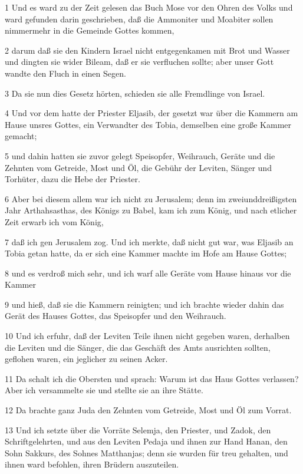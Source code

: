 \par 1 Und es ward zu der Zeit gelesen das Buch Mose vor den Ohren des Volks und ward gefunden darin geschrieben, daß die Ammoniter und Moabiter sollen nimmermehr in die Gemeinde Gottes kommen,
\par 2 darum daß sie den Kindern Israel nicht entgegenkamen mit Brot und Wasser und dingten sie wider Bileam, daß er sie verfluchen sollte; aber unser Gott wandte den Fluch in einen Segen.
\par 3 Da sie nun dies Gesetz hörten, schieden sie alle Fremdlinge von Israel.
\par 4 Und vor dem hatte der Priester Eljasib, der gesetzt war über die Kammern am Hause unsres Gottes, ein Verwandter des Tobia, demselben eine große Kammer gemacht;
\par 5 und dahin hatten sie zuvor gelegt Speisopfer, Weihrauch, Geräte und die Zehnten vom Getreide, Most und Öl, die Gebühr der Leviten, Sänger und Torhüter, dazu die Hebe der Priester.
\par 6 Aber bei diesem allem war ich nicht zu Jerusalem; denn im zweiunddreißigsten Jahr Arthahsasthas, des Königs zu Babel, kam ich zum König, und nach etlicher Zeit erwarb ich vom König,
\par 7 daß ich gen Jerusalem zog. Und ich merkte, daß nicht gut war, was Eljasib an Tobia getan hatte, da er sich eine Kammer machte im Hofe am Hause Gottes;
\par 8 und es verdroß mich sehr, und ich warf alle Geräte vom Hause hinaus vor die Kammer
\par 9 und hieß, daß sie die Kammern reinigten; und ich brachte wieder dahin das Gerät des Hauses Gottes, das Speisopfer und den Weihrauch.
\par 10 Und ich erfuhr, daß der Leviten Teile ihnen nicht gegeben waren, derhalben die Leviten und die Sänger, die das Geschäft des Amts ausrichten sollten, geflohen waren, ein jeglicher zu seinen Acker.
\par 11 Da schalt ich die Obersten und sprach: Warum ist das Haus Gottes verlassen? Aber ich versammelte sie und stellte sie an ihre Stätte.
\par 12 Da brachte ganz Juda den Zehnten vom Getreide, Most und Öl zum Vorrat.
\par 13 Und ich setzte über die Vorräte Selemja, den Priester, und Zadok, den Schriftgelehrten, und aus den Leviten Pedaja und ihnen zur Hand Hanan, den Sohn Sakkurs, des Sohnes Matthanjas; denn sie wurden für treu gehalten, und ihnen ward befohlen, ihren Brüdern auszuteilen.
